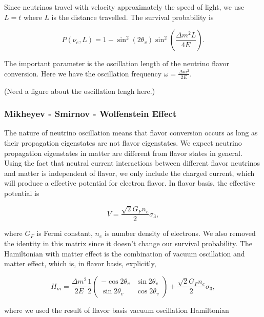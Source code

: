 \documentclass[%
 aip,
 jmp,%
 amsmath,amssymb,
 reprint,%
]{revtex4-1}
\begin{document}
Since neutrinos travel with velocity approximately the speed of light, we use $L = t$ where $L$ is the distance travelled. The survival probability is

\begin{equation}
P(\nu_e,L) =  1-\sin^2(2\theta_v)\sin^2\left( \frac{\Delta m^2 L}{4E} \right).
\end{equation}


The important parameter is the oscillation length of the neutrino flavor conversion. Here we have the oscillation frequency $\omega = \frac{\Delta m^2}{2E}$.

(Need a figure about the oscillation lengh here.)



\subsubsection{Mikheyev - Smirnov - Wolfenstein Effect}

The nature of neutrino oscillation means that flavor conversion occurs as long as their propagation eigenstates are not flavor eigenstates. We expect neutrino propagation eigenstates in matter are different from flavor states in general.\cite{wolf78} Using the fact that neutral current interactions between different flavor neutrinos and matter is independent of flavor, we only include the charged current, which will produce a effective potential for electron flavor. In flavor basis, the effective potential is

\begin{equation}
V=\frac{\sqrt{2}G_F n_e}{2} \sigma_3,
\end{equation}

where $G_F$ is Fermi constant, $n_e$ is number density of electrons. We also removed the identity in this matrix since it doesn't change our survival probability. The Hamiltonian with matter effect is the combination of vacuum oscillation and matter effect, which is, in flavor basis, explicitly,

\begin{equation}
H_m = \frac{ \Delta m^2 }{2E}\frac{1}{2}\begin{pmatrix} -\cos 2\theta_v & \sin 2 \theta_v \\ \sin 2\theta_v & \cos 2\theta_v  \end{pmatrix} + \frac{\sqrt{2}G_F n_e}{2} \sigma_3,
\end{equation}

where we used the result of flavor basis vacuum oscillation Hamiltonian
\end{document}
